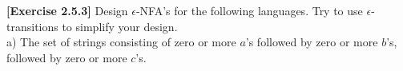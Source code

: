 \textbf{[Exercise 2.5.3]} Design $\epsilon$-NFA's for the following languages. 
Try to use $\epsilon$-transitions to simplify your design.\\
a) The set of strings consisting of zero or more $a$'s followed by zero or 
more $b$'s, followed by zero or more $c$'s.